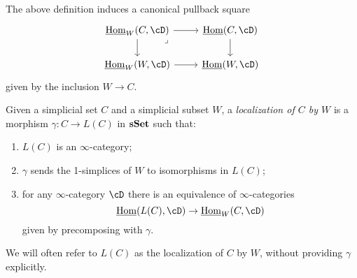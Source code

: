 \begin{rmk}
  The above definition induces a canonical pullback square
  \[\begin{tikzcd}
    {\home_W(C,\cD)} & {\home(C,\cD)} \\
    {\home_W(W,\cD)} & {\home(W,\cD)}
    \arrow[from=1-1, to=2-1]
    \arrow[from=2-1, to=2-2]
    \arrow[from=1-2, to=2-2]
    \arrow[from=1-1, to=1-2]
    \arrow["\lrcorner"{anchor=center, pos=0.125}, draw=none, from=1-1, to=2-2]
  \end{tikzcd}\]
  given by the inclusion $W\rightarrow C$.
\end{rmk}

\begin{defn}
  Given a simplicial set $C$ and a simplicial subset $W$, a \emph{localization
  of $C$ by $W$} is a morphism $\gamma\colon C\rightarrow L(C)$ in $\operatorname{\mathbf{sSet}}$ such
  that:
  \begin{enumerate}
    \item $L(C)$ is an $\infty$-category;
    \item $\gamma$ sends the 1-simplices of $W$ to isomorphisms in $L(C)$;
    \item for any $\infty$-category $\cD$ there is an equivalence of
      $\infty$-categories
      \[\home(L(C),\cD)\rightarrow\home_W(C,\cD)\]
      given by precomposing with $\gamma$.
  \end{enumerate}

  \noindent
  We will often refer to $L(C)$ as the localization of $C$ by $W$, without
  providing $\gamma$ explicitly.
\end{defn}

